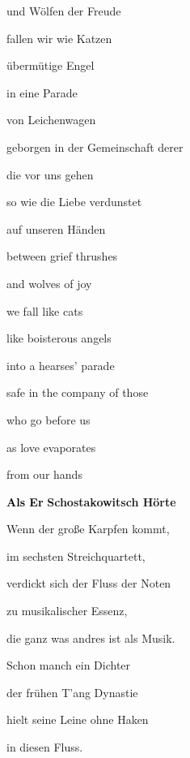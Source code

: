 und Wölfen der Freude


\bigskip

fallen wir wie Katzen

übermütige Engel


\bigskip

in eine Parade

von Leichenwagen


\bigskip

geborgen in der Gemeinschaft derer

die vor uns gehen


\bigskip

so wie die Liebe verdunstet

auf unseren Händen


\bigskip



\bigskip

between grief thrushes

and wolves of joy


\bigskip

we fall like cats

like boisterous angels


\bigskip

into a hearses' parade


\bigskip

safe in the company of those

who go before us


\bigskip

as love evaporates

from our hands


\bigskip

\clearpage
\textbf{\textcolor{black}{Als Er}} \textbf{Schostakowitsch Hörte}


\bigskip

Wenn der große Karpfen kommt,

im sechsten Streichquartett,

verdickt sich der Fluss der Noten

zu musikalischer Essenz,


\bigskip

die ganz was andres ist als Musik. 


\bigskip

Schon manch ein Dichter

der frühen T'ang Dynastie

hielt seine Leine ohne Haken

in diesen Fluss.


